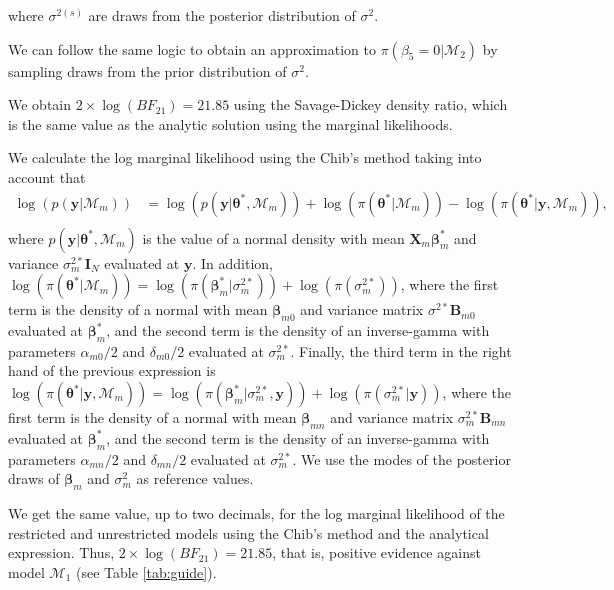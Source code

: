 where $\sigma^{2(s)}$ are draws from the posterior distribution of $\sigma^2$.

We can follow the same logic to obtain an approximation to $\pi(\beta_5=0|\mathcal{M}_2)$ by sampling draws from the prior distribution of $\sigma^2$.

We obtain $2 \times \log(BF_{21}) = 21.85$ using the Savage-Dickey density ratio, which is the same value as the analytic solution using the marginal likelihoods.
  

We calculate the log marginal likelihood using the Chib's method taking into account that 
\begin{align*}
	\log(p(\bm{y}|\mathcal{M}_m))&=\log(p(\bm{y}|\bm{\theta}^*,\mathcal{M}_m))+\log(\pi(\bm{\theta}^*|\mathcal{M}_m))-\log(\pi(\bm{\theta}^*|\bm{y},\mathcal{M}_m)),\\
\end{align*}
where $p(\bm{y}|\bm{\theta}^*,\mathcal{M}_m)$ is the value of a normal density with mean $\bm{X}_m\bm{\beta}_{m}^*$ and variance $\sigma^{2*}_m\bm{I}_N$ evaluated at $\bm{y}$. In addition, $\log(\pi(\bm{\theta}^*|\mathcal{M}_m))=\log(\pi(\bm{\beta}_m^*|\sigma^{2*}_m))+\log(\pi(\sigma^{2*}_m))$, where the first term is the density of a normal with mean $\bm{\beta}_{m0}$ and variance matrix $\sigma^{2*}\bm{B}_{m0}$ evaluated at $\bm{\beta}_m^*$, and the second term is the density of an inverse-gamma with parameters $\alpha_{m0}/2$ and $\delta_{m0}/2$ evaluated at $\sigma^{2*}_m$. Finally, the third term in the right hand of the previous expression is $\log(\pi(\bm{\theta}^*|\bm{y},\mathcal{M}_m))=\log(\pi(\bm{\beta}_m^*|\sigma^{2*}_m,\bm{y}))+\log(\pi(\sigma^{2*}_m|\bm{y}))$, where the first term is the density of a normal with mean $\bm{\beta}_{mn}$ and variance matrix $\sigma^{2*}_m\bm{B}_{mn}$ evaluated at $\bm{\beta}_m^*$, and the second term is the density of an inverse-gamma with parameters $\alpha_{mn}/2$ and $\delta_{mn}/2$ evaluated at $\sigma^{2*}_m$. We use the modes of the posterior draws of $\bm{\beta}_m$ and $\sigma^2_m$ as reference values. 

We get the same value, up to two decimals, for the log marginal likelihood of the restricted and unrestricted models using the Chib's method and the analytical expression. Thus, $2\times\log(BF_{21})=21.85$, that is, positive evidence against model $\mathcal{M}_1$ (see Table \ref{tab:guide}).

